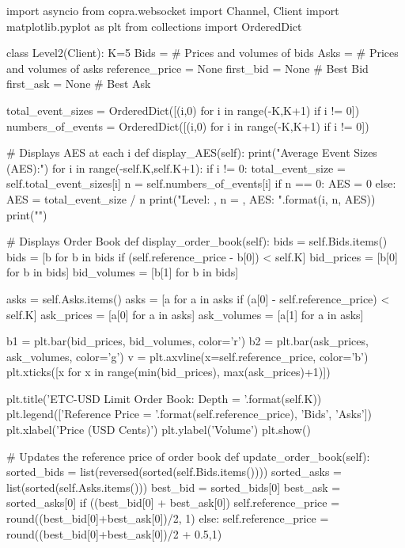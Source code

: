 import asyncio
from copra.websocket import Channel, Client
import matplotlib.pyplot as plt
from collections import OrderedDict

class Level2(Client):
    K=5
    Bids = {} # Prices and volumes of bids
    Asks = {} # Prices and volumes of asks
    reference_price = None
    first_bid = None # Best Bid
    first_ask = None # Best Ask
    
    total_event_sizes = OrderedDict([(i,0) for i in range(-K,K+1) if i != 0])
    numbers_of_events = OrderedDict([(i,0) for i in range(-K,K+1) if i != 0])

    # Displays AES at each i
    def display_AES(self):
        print("Average Event Sizes (AES):")
        for i in range(-self.K,self.K+1):
            if i != 0:
                total_event_size = self.total_event_sizes[i]
                n = self.numbers_of_events[i]
                if n == 0:
                    AES = 0
                else:
                    AES = total_event_size / n
                print("Level: {}, n = {}, AES: {}".format(i, n, AES))
        print("\n")
    
    # Displays Order Book
    def display_order_book(self):
        bids = self.Bids.items()
        bids = [b for b in bids if (self.reference_price - b[0]) < self.K]
        bid_prices = [b[0] for b in bids]
        bid_volumes = [b[1] for b in bids]
        
        asks = self.Asks.items()
        asks = [a for a in asks if (a[0] - self.reference_price) < self.K]
        ask_prices = [a[0] for a in asks]
        ask_volumes = [a[1] for a in asks]
        
        b1 = plt.bar(bid_prices, bid_volumes, color='r')
        b2 = plt.bar(ask_prices, ask_volumes, color='g')
        v = plt.axvline(x=self.reference_price, color='b')
        plt.xticks([x for x in range(min(bid_prices), max(ask_prices)+1)])
        
        plt.title('ETC-USD Limit Order Book: Depth = {}'.format(self.K))
        plt.legend(['Reference Price = {}'.format(self.reference_price), 'Bids', 'Asks'])
        plt.xlabel('Price (USD Cents)')
        plt.ylabel('Volume')
        plt.show()
    
    # Updates the reference price of order book
    def update_order_book(self):
        sorted_bids = list(reversed(sorted(self.Bids.items())))
        sorted_asks = list(sorted(self.Asks.items()))        
        best_bid = sorted_bids[0]
        best_ask = sorted_asks[0]
        if ((best_bid[0] + best_ask[0]) %
            self.reference_price = round((best_bid[0]+best_ask[0])/2, 1)
        else:
            self.reference_price = round((best_bid[0]+best_ask[0])/2 + 0.5,1)  
            
